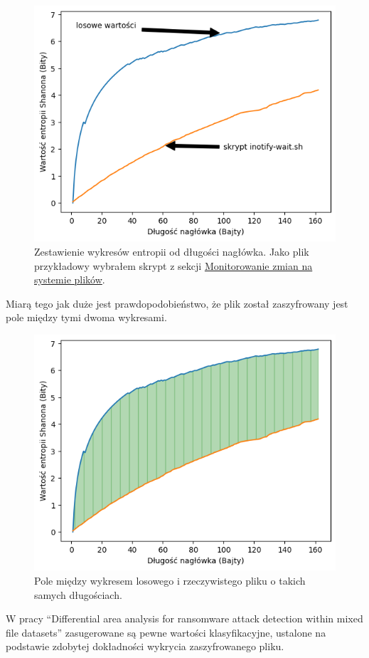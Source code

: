 \begin{figure}[H]
    \centering
    \includegraphics[width=0.7\linewidth]{rysunki/zestawienie.png}
    \caption{Zestawienie wykresów entropii od długości nagłówka. Jako plik przykładowy wybrałem skrypt z sekcji \hyperref[sec:monitorowanie]{Monitorowanie zmian na systemie plików}.}
    \label{fig:enter-label}
\end{figure}
Miarą tego jak duże jest prawdopodobieństwo, że plik został zaszyfrowany jest pole między tymi dwoma wykresami.
\begin{figure}[H]
    \centering
    \includegraphics[width=0.7\linewidth]{rysunki/pole.png}
    \caption{Pole między wykresem losowego i rzeczywistego pliku o takich samych długościach.}
    \label{fig:enter-label}
\end{figure}
W pracy \foreignquote{english}{Differential area analysis for ransomware
attack detection within mixed file datasets} zasugerowane są pewne wartości klasyfikacyjne, ustalone na podstawie
zdobytej dokładności wykrycia zaszyfrowanego pliku.
